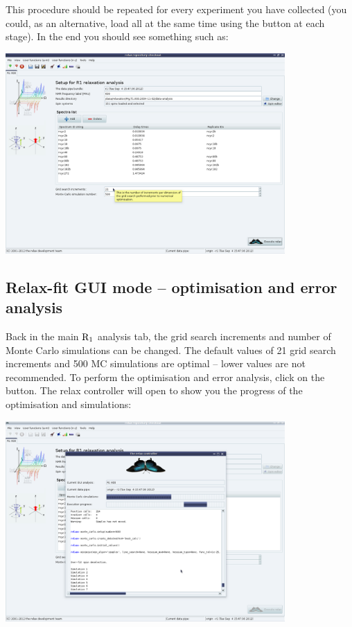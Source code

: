 This procedure should be repeated for every experiment you have collected (you could, as an alternative, load all at the same time using the  button at each stage).  In the end you should see something such as:

\begin{minipage}[h]{\linewidth}
\centerline{\includegraphics[width=0.8\textwidth, bb=14 14 1415 1019]{graphics/screenshots/r1_analysis/analysis_tab_full}}
\end{minipage}



\subsection{Relax-fit GUI mode -- optimisation and error analysis}

Back in the main $\mathrm{R}_1$ analysis tab, the grid search increments and number of Monte Carlo simulations can be changed.  The default values of 21 grid search increments and 500 MC simulations are optimal -- lower values are not recommended.  To perform the optimisation and error analysis, click on the  button.  The relax controller will open to show you the progress of the optimisation and simulations:

\begin{minipage}[h]{\linewidth}
\centerline{\includegraphics[width=0.8\textwidth, bb=14 14 1415 1019]{graphics/screenshots/r1_analysis/mc_sim}}
\end{minipage}

